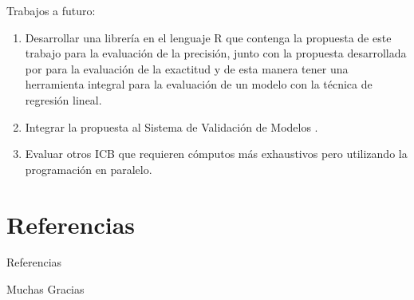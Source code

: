 \documentclass[serif, aspectratio=169]{beamer}
\begin{document}
\begin{frame}
	
	\begin{exampleblock}{Trabajos a futuro:}
		\begin{enumerate}
			\item Desarrollar una librería en el lenguaje R que contenga la propuesta de este trabajo para la evaluación de la precisión, junto con la propuesta desarrollada por \textcite{zacarias-2023} para la evaluación de la exactitud y de esta manera tener una herramienta integral para la evaluación de un modelo con la técnica de regresión lineal.
			
			\item Integrar la propuesta al Sistema de Validación de Modelos \parencite{mazun-2014}.
			
			
			\item Evaluar otros ICB que requieren cómputos más exhaustivos pero utilizando la programación en paralelo.
			
		\end{enumerate}
	\end{exampleblock}
	
\end{frame}







\section{Referencias}

\begin{frame}{Referencias}
	
    \printbibliography
\end{frame}


\begin{frame}
    \begin{center}
        {\Huge\calligra Muchas Gracias}
    \end{center}
\end{frame}
\end{document}
